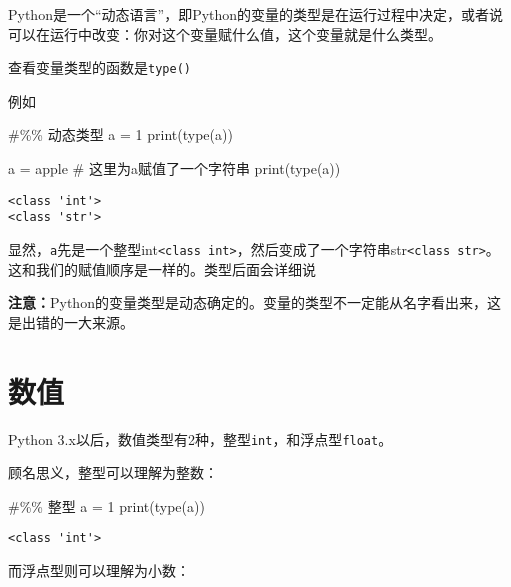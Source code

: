 \documentclass[
  letterpaper,
  DIV=11,
  numbers=noendperiod]{scrreprt}
\newenvironment{Shaded}{\begin{snugshade}}{\end{snugshade}}
\newcommand{\BuiltInTok}[1]{\textcolor[rgb]{0.00,0.23,0.31}{#1}}
\newcommand{\CommentTok}[1]{\textcolor[rgb]{0.37,0.37,0.37}{#1}}
\newcommand{\DecValTok}[1]{\textcolor[rgb]{0.68,0.00,0.00}{#1}}
\newcommand{\NormalTok}[1]{\textcolor[rgb]{0.00,0.23,0.31}{#1}}
\newcommand{\OperatorTok}[1]{\textcolor[rgb]{0.37,0.37,0.37}{#1}}
\newcommand{\StringTok}[1]{\textcolor[rgb]{0.13,0.47,0.30}{#1}}
\begin{document}
Python是一个``动态语言''，即Python的变量的类型是在运行过程中决定，或者说可以在运行中改变：你对这个变量赋什么值，这个变量就是什么类型。

查看变量类型的函数是\texttt{type()}

例如

\begin{Shaded}
\begin{Highlighting}[]
\CommentTok{\#\%\% 动态类型}
\NormalTok{a }\OperatorTok{=} \DecValTok{1} 
\BuiltInTok{print}\NormalTok{(}\BuiltInTok{type}\NormalTok{(a))}

\NormalTok{a }\OperatorTok{=} \StringTok{\textquotesingle{}apple\textquotesingle{}} \CommentTok{\# 这里为a赋值了一个字符串}
\BuiltInTok{print}\NormalTok{(}\BuiltInTok{type}\NormalTok{(a))}
\end{Highlighting}
\end{Shaded}

\begin{verbatim}
<class 'int'>
<class 'str'>
\end{verbatim}

显然，\texttt{a}先是一个整型int\texttt{\textless{}class\ \textquotesingle{}int\textquotesingle{}\textgreater{}}，然后变成了一个字符串str\texttt{\textless{}class\ \textquotesingle{}str\textquotesingle{}\textgreater{}}。
这和我们的赋值顺序是一样的。类型后面会详细说

\textbf{注意：}Python的变量类型是动态确定的。变量的类型不一定能从名字看出来，这是出错的一大来源。

\hypertarget{ux6570ux503c}{%
\section{数值}\label{ux6570ux503c}}

Python
3.x以后，数值类型有2种，整型\texttt{int}，和浮点型\texttt{float}。

顾名思义，整型可以理解为整数：

\begin{Shaded}
\begin{Highlighting}[]
\CommentTok{\#\%\% 整型}
\NormalTok{a }\OperatorTok{=} \DecValTok{1}
\BuiltInTok{print}\NormalTok{(}\BuiltInTok{type}\NormalTok{(a))}
\end{Highlighting}
\end{Shaded}

\begin{verbatim}
<class 'int'>
\end{verbatim}

而浮点型则可以理解为小数：
\end{document}
